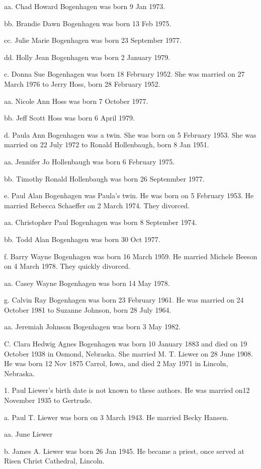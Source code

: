 \documentclass[a4paper]{article}
\begin{document}
aa. Chad Howard Bogenhagen was born 9 Jan 1973.

bb. Brandie Dawn Bogenhagen was born 13 Feb 1975.

cc. Julie Marie Bogenhagen was born 23 September 1977.

dd. Holly Jean Bogenhagen was born 2 January 1979.

c. Donna Sue Bogenhagen was born 18 February 1952.  She was married on 27 March 1976 to Jerry Hoss, born 28 February 1952.

aa. Nicole Ann Hoss was born 7 October 1977.

bb. Jeff Scott Hoss was born 6 April 1979.

d. Paula Ann Bogenhagen was a twin.  She was born on 5 February 1953. She was married on 22 July 1972 to Ronald Hollenbaugh, born 8 Jan 1951.

aa. Jennifer Jo Hollenbaugh was born 6 February 1975.

bb. Timothy Ronald Hollenbaugh was born 26 Septenmber 1977.
		
e. Paul Alan Bogenhagen was Paula's twin.  He was born on 5 February 1953.  He married Rebecca Schaeffer on 2 March 1974.  They divorced.

aa. Christopher Paul Bogenhagen was born 8 September 1974.

bb. Todd Alan Bogenhagen was born 30 Oct 1977.

f. Barry Wayne Bogenhagen was born 16 March 1959.  He married Michele Beeson on 4 March 1978.  They quickly divorced.

aa. Casey Wayne Bogenhagen was born 14 May 1978.

g. Calvin Ray Bogenhagen was born 23 February 1961.  He was married on 24 October 1981 to Suzanne Johnson, born 28 July 1964. 

aa. Jeremiah Johnson Bogenhagen was born 3 May 1982.

C.  Clara Hedwig Agnes Bogenhagen was born 10 January 1883 and died on 19 October 1938 in Osmond, Nebraska.  She married M. T. Liewer on 28 June 1908.  He was born 12 Nov 1875 Carrol, Iowa, and died 2 May 1971 in Lincoln, Nebraska.

1. Paul Liewer's birth date is not known to these authors.  He was married on12 November 1935 to Gertrude.

a. Paul T. Liewer was born on 3 March 1943.  He married Becky Hansen.

aa. June Liewer

b. James A. Liewer was born 26 Jan 1945.  He became a priest, once served at Risen Christ Cathedral, Lincoln.
\end{document}
